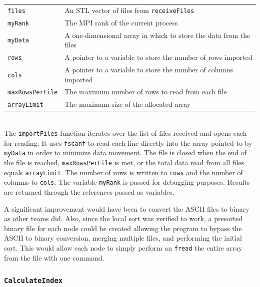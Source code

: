 \documentclass{article}
\begin{document}
\begin{tabular}{l l}
\texttt{\texttt{files}}          & An STL vector of files from \texttt{receiveFiles} \\
\texttt{\texttt{myRank}}         & The MPI rank of the current process \\
\texttt{\texttt{myData}}         & A one-dimensional array in which to store the data from the files \\
\texttt{\texttt{rows}}           & A pointer to a variable to store the number of rows imported \\
\texttt{\texttt{cols}}           & A pointer to a variable to store the number of columns imported  \\
\texttt{\texttt{maxRowsPerFile}} & The maximum number of rows to read from each file \\
\texttt{\texttt{arrayLimit}}     & The maximum size of the allocated array \\
\end{tabular} \\

The \texttt{importFiles} function iterates over the list of files received and opens each for reading. It uses \texttt{fscanf} to read each line directly into the array pointed to by \texttt{myData} in order to minimize data movement. The file is closed when the end of the file is reached, \texttt{maxRowsPerFile} is met, or the total data read from all files equals \texttt{arrayLimit}. The number of rows is written to \texttt{rows} and the number of columns to \texttt{cols}. The variable \texttt{myRank} is passed for debugging purposes. Results are returned through the references passed as variables.

A significant improvement would have been to convert the ASCII files to binary as other teams did. Also, since the local sort was verified to work, a presorted binary file for each node could be created allowing the program to bypass the ASCII to binary conversion, merging multiple files, and performing the initial sort. This would allow each node to simply perform an \texttt{fread} the entire array from the file with one command.


%
%

\subsubsection{\texttt{CalculateIndex}}\label{sec:calculateindex}
\end{document}
